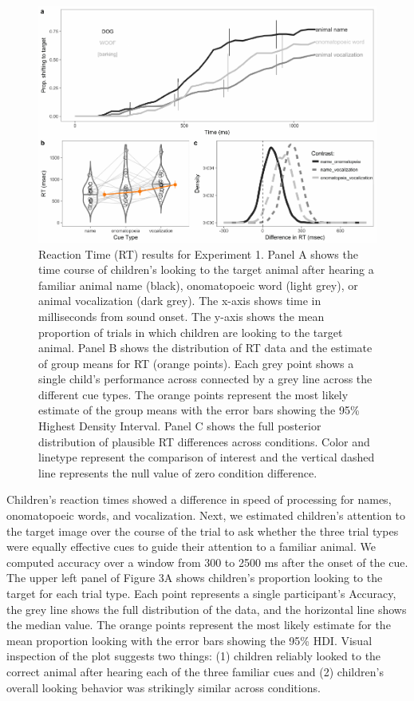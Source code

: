 \documentclass[english,floatsintext,man]{apa6}
\theoremstyle{definition}
\theoremstyle{definition}
\theoremstyle{definition}
\theoremstyle{remark}
\begin{document}
\begin{figure}[H]
\includegraphics[width=0.95\linewidth]{anime_manuscript_files/figure-latex/oc-plot-e1-1} \caption{Reaction Time (RT) results for Experiment 1. Panel A shows the time course of children’s looking to the target animal after hearing a familiar animal name (black), onomatopoeic word (light grey), or animal vocalization (dark grey). The x-axis shows time in milliseconds from sound onset. The y-axis shows the mean proportion of trials in which children are looking to the target animal. Panel B shows the distribution of RT data and the estimate of group means for RT (orange points). Each grey point shows a single child's performance across connected by a grey line across the different cue types. The orange points represent the most likely estimate of the group means with the error bars showing the 95\% Highest Density Interval. Panel C shows the full posterior distribution of plausible RT differences across conditions. Color and linetype represent the comparison of interest and the vertical dashed line represents the null value of zero condition difference.}\label{fig:oc-plot-e1}
\end{figure}

Children's reaction times showed a difference in speed of processing for
names, onomatopoeic words, and vocalization. Next, we estimated
children's attention to the target image over the course of the trial to
ask whether the three trial types were equally effective cues to guide
their attention to a familiar animal. We computed accuracy over a window
from 300 to 2500 ms after the onset of the cue. The upper left panel of
Figure 3A shows children's proportion looking to the target for each
trial type. Each point represents a single participant's Accuracy, the
grey line shows the full distribution of the data, and the horizontal
line shows the median value. The orange points represent the most likely
estimate for the mean proportion looking with the error bars showing the
95\% HDI. Visual inspection of the plot suggests two things: (1)
children reliably looked to the correct animal after hearing each of the
three familiar cues and (2) children's overall looking behavior was
strikingly similar across conditions.
\end{document}
